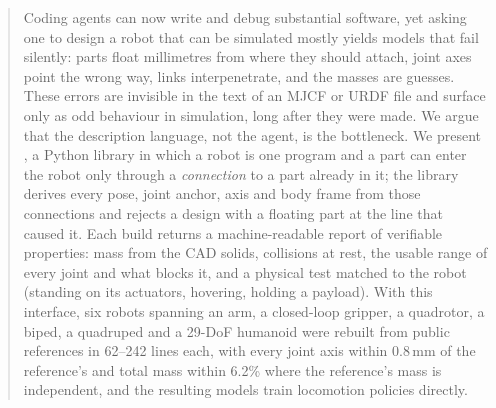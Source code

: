 \begin{abstract}
Coding agents can now write and debug substantial software, yet asking one to design a robot that
can be simulated mostly yields models that fail silently: parts float millimetres from where they
should attach, joint axes point the wrong way, links interpenetrate, and the masses are guesses.
These errors are invisible in the text of an MJCF or URDF file and surface only as odd behaviour
in simulation, long after they were made. We argue that the description language, not the agent,
is the bottleneck. We present \ms, a Python library in which a robot is one program and a part
can enter the robot only through a \emph{connection} to a part already in it; the library derives
every pose, joint anchor, axis and body frame from those connections and rejects a design with a
floating part at the line that caused it. Each build returns a machine-readable report of
verifiable properties: mass from the CAD solids, collisions at rest, the usable range of every
joint and what blocks it, and a physical test matched to the robot (standing on its actuators,
hovering, holding a payload). With this interface, six robots spanning an arm, a closed-loop
gripper, a quadrotor, a biped, a quadruped and a 29-DoF humanoid were rebuilt from public
references in 62--242 lines each, with every joint axis within 0.8\,mm of the reference's and
total mass within 6.2\% where the reference's mass is independent, and the resulting models train
locomotion policies directly.
\end{abstract}
